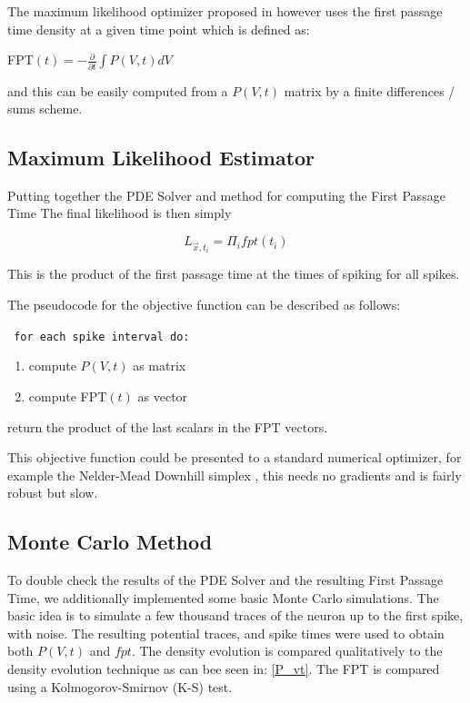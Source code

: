 \documentclass[10pt]{article}
\begin{document}
The maximum likelihood optimizer proposed in
\cite{PaninskiPillowSimoncelli} however uses the first passage time
density at a given time point which is defined as:

    FPT$(t)  = -\frac{\partial}{\partial t} \int P(V,t)dV $

and this can be easily computed from a $P(V,t)$ matrix by a finite differences
/ sums scheme.

\subsection{Maximum Likelihood Estimator}

Putting together the PDE Solver and method for computing the First
Passage Time 
The final likelihood is then simply

\begin{equation}
    L_{\vec{x},t_{i}} = \Pi_{i} fpt(t_{i})
\end{equation}

This is the product of the first passage time at the times of
spiking for all spikes.

The pseudocode for the objective function can be described as follows:

{\tt
for each spike interval do:
\begin{enumerate}
    \item compute $P(V,t)$ as matrix
    \item compute FPT$(t)$ as vector
\end{enumerate}
return the product of the last scalars in the FPT vectors.}

This objective function could be presented to a standard numerical
optimizer, for example the Nelder-Mead Downhill simplex \cite{press},
this needs no gradients and is fairly robust but slow.

\subsection{Monte Carlo Method}

To double check the results of the PDE Solver and the resulting First
Passage Time, we additionally implemented some basic Monte Carlo
simulations. The basic idea is to simulate a few thousand traces of the neuron
up to the first spike, with noise. The resulting potential traces, and spike
times were used to obtain both $P(V,t)$ and $fpt$. The density evolution is
compared qualitatively to the density evolution technique as can bee seen in:
\ref{P_vt}. The FPT is compared using a Kolmogorov-Smirnov (K-S)
test\cite{press}.
\end{document}

